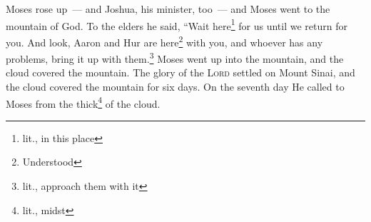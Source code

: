 \begin{enumerate}[align=center]
     Moses rose up~--- and Joshua, his minister, too~--- and Moses went to the mountain of God.%
     To the elders he said, ``Wait here\footnote{lit., in this place} for us until we return for you. And look, Aaron and Hur are here\footnote{Understood} with you, and whoever has any problems, bring it up with them.\footnote{lit., approach them with it}%
     Moses went up into the mountain, and the cloud covered the mountain.%
     The glory of the \textsc{Lord} settled on Mount Sinai, and the cloud covered the mountain for six days. On the seventh day He called to Moses from the thick\footnote{lit., midst} of the cloud.%
\end{enumerate}
